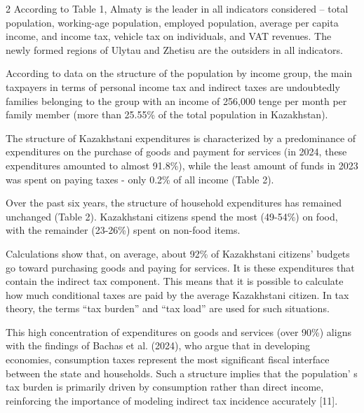 \begin{multicols}{2}
According to Table 1, Almaty is the leader in all indicators considered
-- total population, working-age population, employed population,
average per capita income, and income tax, vehicle tax on individuals,
and VAT revenues. The newly formed regions of Ulytau and Zhetisu are the
outsiders in all indicators.

According to data on the structure of the population by income group,
the main taxpayers in terms of personal income tax and indirect taxes
are undoubtedly families belonging to the group with an income of
256,000 tenge per month per family member (more than 25.55\% of the
total population in Kazakhstan).

The structure of Kazakhstani expenditures is characterized by a
predominance of expenditures on the purchase of goods and payment for
services (in 2024, these expenditures amounted to almost 91.8\%), while
the least amount of funds in 2023 was spent on paying taxes - only 0.2\%
of all income (Table 2).

Over the past six years, the structure of household expenditures has
remained unchanged (Table 2). Kazakhstani citizens spend the most
(49-54\%) on food, with the remainder (23-26\%) spent on non-food items.

Calculations show that, on average, about 92\% of Kazakhstani
citizens'{} budgets go toward purchasing goods and paying
for services. It is these expenditures that contain the indirect tax
component. This means that it is possible to calculate how much
conditional taxes are paid by the average Kazakhstani citizen. In tax
theory, the terms ``tax burden'' and ``tax load'' are used for such
situations.

This high concentration of expenditures on goods and services (over
90\%) aligns with the findings of Bachas et al. (2024), who argue that
in developing economies, consumption taxes represent the most
significant fiscal interface between the state and households. Such a
structure implies that the population' s tax burden is
primarily driven by consumption rather than direct income, reinforcing
the importance of modeling indirect tax incidence accurately {[}11{]}.
\end{multicols}

